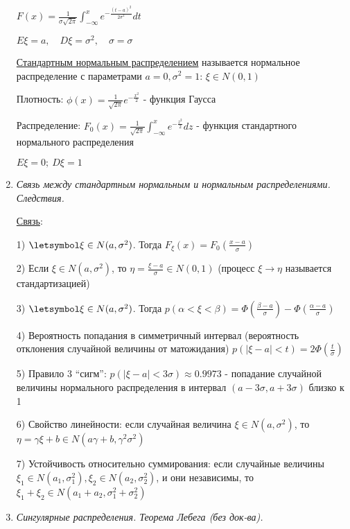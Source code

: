 \begin{enumerate}
    $F(x) = \frac{1}{\sigma \sqrt{2\pi}} \int_{-\infty}^x e^{-\frac{(t - a)^2}{2\sigma^2}} dt$

    $E\xi = a, \quad D\xi = \sigma^2, \quad \sigma = \sigma$

    \hyperlink{standardnormaldistribution}{Стандартным нормальным распределением} называется нормальное распределение с параметрами $a = 0, \sigma^2 = 1$: $\xi \in N(0, 1)$

    Плотность: $\phi(x) = \frac{1}{\sqrt{2\pi}} e^{-\frac{x^2}{2}}$ - функция Гаусса

    Распределение: $F_0(x) = \frac{1}{\sqrt{2\pi}} \int_{-\infty}^x e^{-\frac{z^2}{2}} dz$ - функция стандартного нормального распределения

    $E\xi = 0; \ D\xi = 1$

    \item \textit{Связь между стандартным нормальным и нормальным распределениями. Следствия.}

    \hyperlink{connectionbetweennormalandstandard}{Связь}: 

    1) $\letsymbol \xi \in N(a, \sigma^2)$. Тогда $F_\xi(x) = F_0\left(\frac{x - a}{\sigma}\right)$

    2) Если $\xi \in N(a, \sigma^2)$, то $\eta = \frac{\xi - a}{\sigma} \in N(0, 1)$ (процесс $\xi \to \eta$ называется стандартизацией)

    3) $\letsymbol \xi \in N(a, \sigma^2)$. Тогда $p(\alpha < \xi < \beta) = \Phi\left(\frac{\beta - a}{\sigma}\right) - \Phi\left(\frac{\alpha - a}{\sigma}\right)$

    4) Вероятность попадания в симметричный интервал (вероятность отклонения случайной величины от матожидания) 
    $p(|\xi - a| < t) = 2\Phi\left(\frac{t}{\sigma}\right)$

    5) Правило 3 \enquote{сигм}: $p(|\xi - a| < 3\sigma) \approx 0.9973$ - попадание случайной величины нормального распределения в интервал $(a - 3\sigma, a + 3\sigma)$ близко к 1

    6) Свойство линейности: если случайная величина $\xi \in N(a, \sigma^2)$, то $\eta = \gamma \xi + b \in N(a \gamma + b, \gamma^2 \sigma^2)$ 
    
    7) Устойчивость относительно суммирования: если случайные величины $\xi_1 \in N(a_1, \sigma_1^2), \xi_2 \in N(a_2, \sigma_2^2)$, и они независимы, то $\xi_1 + \xi_2 \in N(a_1 + a_2, \sigma^2_1 + \sigma^2_2)$

    
    \item \textit{Сингулярные распределения. Теорема Лебега (без док-ва).}


\end{enumerate}

